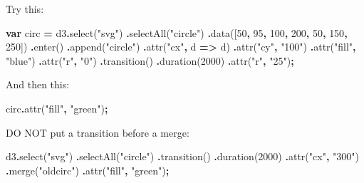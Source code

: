 \documentclass[
  openany]{book}
\newenvironment{Shaded}{\begin{snugshade}}{\end{snugshade}}
\newcommand{\DecValTok}[1]{\textcolor[rgb]{0.00,0.00,0.81}{#1}}
\newcommand{\FunctionTok}[1]{\textcolor[rgb]{0.00,0.00,0.00}{#1}}
\newcommand{\KeywordTok}[1]{\textcolor[rgb]{0.13,0.29,0.53}{\textbf{#1}}}
\newcommand{\NormalTok}[1]{#1}
\newcommand{\OperatorTok}[1]{\textcolor[rgb]{0.81,0.36,0.00}{\textbf{#1}}}
\newcommand{\StringTok}[1]{\textcolor[rgb]{0.31,0.60,0.02}{#1}}
\begin{document}
Try this:

\begin{Shaded}
\begin{Highlighting}[]
\KeywordTok{var}\NormalTok{ circ }\OperatorTok{=}\NormalTok{ d3}\OperatorTok{.}\FunctionTok{select}\NormalTok{(}\StringTok{"svg"}\NormalTok{)}
  \OperatorTok{.}\FunctionTok{selectAll}\NormalTok{(}\StringTok{"circle"}\NormalTok{)}
  \OperatorTok{.}\FunctionTok{data}\NormalTok{([}\DecValTok{50}\OperatorTok{,} \DecValTok{95}\OperatorTok{,} \DecValTok{100}\OperatorTok{,} \DecValTok{200}\OperatorTok{,} \DecValTok{50}\OperatorTok{,} \DecValTok{150}\OperatorTok{,} \DecValTok{250}\NormalTok{])}
  \OperatorTok{.}\FunctionTok{enter}\NormalTok{()}
  \OperatorTok{.}\FunctionTok{append}\NormalTok{(}\StringTok{"circle"}\NormalTok{)}
    \OperatorTok{.}\FunctionTok{attr}\NormalTok{(}\StringTok{"cx"}\OperatorTok{,}\NormalTok{ d }\KeywordTok{=\textgreater{}}\NormalTok{ d)}
    \OperatorTok{.}\FunctionTok{attr}\NormalTok{(}\StringTok{"cy"}\OperatorTok{,} \StringTok{"100"}\NormalTok{)}
    \OperatorTok{.}\FunctionTok{attr}\NormalTok{(}\StringTok{"fill"}\OperatorTok{,} \StringTok{"blue"}\NormalTok{)}
    \OperatorTok{.}\FunctionTok{attr}\NormalTok{(}\StringTok{"r"}\OperatorTok{,} \StringTok{"0"}\NormalTok{)}
    \OperatorTok{.}\FunctionTok{transition}\NormalTok{()}
    \OperatorTok{.}\FunctionTok{duration}\NormalTok{(}\DecValTok{2000}\NormalTok{)}
    \OperatorTok{.}\FunctionTok{attr}\NormalTok{(}\StringTok{"r"}\OperatorTok{,} \StringTok{"25"}\NormalTok{)}\OperatorTok{;}
\end{Highlighting}
\end{Shaded}

And then this:

\begin{Shaded}
\begin{Highlighting}[]
\NormalTok{circ}\OperatorTok{.}\FunctionTok{attr}\NormalTok{(}\StringTok{"fill"}\OperatorTok{,} \StringTok{"green"}\NormalTok{)}\OperatorTok{;}
\end{Highlighting}
\end{Shaded}

DO NOT put a transition before a merge:

\begin{Shaded}
\begin{Highlighting}[]
\NormalTok{d3}\OperatorTok{.}\FunctionTok{select}\NormalTok{(}\StringTok{"svg"}\NormalTok{)}
  \OperatorTok{.}\FunctionTok{selectAll}\NormalTok{(}\StringTok{"circle"}\NormalTok{)}
  \OperatorTok{.}\FunctionTok{transition}\NormalTok{()}
  \OperatorTok{.}\FunctionTok{duration}\NormalTok{(}\DecValTok{2000}\NormalTok{)}
    \OperatorTok{.}\FunctionTok{attr}\NormalTok{(}\StringTok{"cx"}\OperatorTok{,} \StringTok{"300"}\NormalTok{)}
  \OperatorTok{.}\FunctionTok{merge}\NormalTok{(}\StringTok{"oldcirc"}\NormalTok{)}
    \OperatorTok{.}\FunctionTok{attr}\NormalTok{(}\StringTok{"fill"}\OperatorTok{,} \StringTok{"green"}\NormalTok{)}\OperatorTok{;}
\end{Highlighting}
\end{Shaded}
\end{document}
